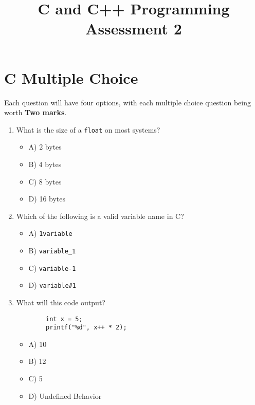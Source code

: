 \documentclass[a4paper,12pt]{article}
\begin{document}
\title{C and C++ Programming Assessment 2}
\maketitle

\newpage
\pagestyle{empty}

\section{C Multiple Choice}

Each question will have four options, with each multiple choice question being worth \textbf{Two marks}.

\begin{enumerate}
    \item What is the size of a \verb|float| on most systems?
    \begin{itemize}
        \item A) 2 bytes
        \item B) 4 bytes
        \item C) 8 bytes
        \item D) 16 bytes
    \end{itemize}

    \item Which of the following is a valid variable name in C?
    \begin{itemize}
        \item A) \verb|1variable|
        \item B) \verb|variable_1|
        \item C) \verb|variable-1|
        \item D) \verb|variable#1|
    \end{itemize}

    \item What will this code output?

    \lstset{language=C}
    \begin{lstlisting}
        int x = 5;
        printf("%d", x++ * 2);
    \end{lstlisting}    
    
    \begin{itemize}
        \item A) 10
        \item B) 12
        \item C) 5
        \item D) Undefined Behavior
    \end{itemize}


\end{enumerate}
\end{document}
